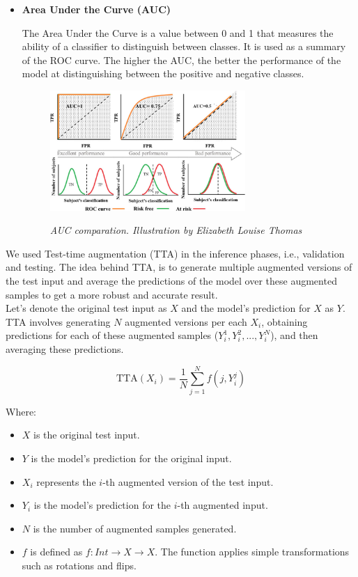 \begin{itemize}
  \item {\bf Area Under the Curve (AUC)}

  The Area Under the Curve is a value between 0 and 1 that measures the
  ability of a classifier to distinguish between classes. It is used as a summary of
  the ROC curve. The higher the AUC, the better the performance of the model at
  distinguishing between the positive and negative classes.

  \begin{figure}[H]
    \centering
    \includegraphics[width=0.7\textwidth]{imatges/validation-strategy/auc.png}
    \caption[AUC-ROC performance]{\textit{AUC comparation. Illustration by Elizabeth Louise Thomas}}
    {\label{fig:auc-roc}}
  \end{figure}

\end{itemize}

\newpage

We used Test-time augmentation (TTA) in the inference phases, i.e., validation
and testing. The idea behind TTA, is to generate multiple augmented versions of
the test input and average the predictions of the model over these augmented
samples to get a more robust and accurate result. \\

Let's denote the original test input as \(X\) and the model's prediction for
\(X\) as \(Y\). TTA involves generating \(N\) augmented versions per each
\(X_i\), obtaining predictions for each of these augmented samples (\(Y_i^1, Y_i^2,
..., Y_i^N\)), and then averaging these predictions.

\[ \text{TTA}(X_i) = \frac{1}{N} \sum_{j=1}^{N} f(j, Y_i^j) \]

Where:

\begin{itemize}
  \item \(X\) is the original test input.
  \item \(Y\) is the model's prediction for the original input.
  \item \(X_i\) represents the \(i\)-th augmented version of the test input.
  \item \(Y_i\) is the model's prediction for the \(i\)-th augmented input.
  \item \(N\) is the number of augmented samples generated.
  \item \(f\) is defined as \(f: Int \rightarrow X \rightarrow X\). The
    function applies simple transformations such as rotations and flips.
\end{itemize}


